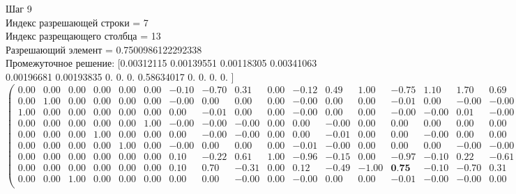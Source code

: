 \documentclass{article}
\begin{document}
\begin{flushleft}
    Шаг 9\\
Индекс разрешающей строки = 7\\
Индекс разрещающего столбца = 13\\
Разрешающий элемент = 0.7500986122292338\\
Промежуточное решение:
 [0.00312115 0.00139551 0.00118305 0.00341063 0.00196681 0.00193835
 0.         0.         0.         0.58634017 0.         0.
 0.         0.        ]
\begin{equation*}
\begin{pmatrix}
 0.00 & 0.00 & 0.00 & 0.00 & 0.00 & 0.00 & -0.10 & -0.70 &  0.31 & 0.00 & -0.12 &  0.49 &  1.00 & -0.75 &  1.10 &  1.70 &  0.69 &  1.00 &  1.12 &  0.51 & 0.00 &  1.75 & -0.12 \\
 0.00 & 1.00 & 0.00 & 0.00 & 0.00 & 0.00 & -0.00 &  0.00 &  0.00 & 0.00 & -0.00 &  0.00 &  0.00 & -0.01 &  0.00 & -0.00 & -0.00 &  0.00 &  0.00 & -0.00 & 0.00 &  0.01 &  0.00 \\
 1.00 & 0.00 & 0.00 & 0.00 & 0.00 & 0.00 &  0.00 & -0.01 &  0.00 & 0.00 & -0.00 &  0.00 &  0.00 & -0.00 & -0.00 &  0.01 & -0.00 &  0.00 &  0.00 & -0.00 & 0.00 &  0.00 &  0.00 \\
 0.00 & 0.00 & 0.00 & 0.00 & 0.00 & 1.00 & -0.00 & -0.00 & -0.00 & 0.00 &  0.00 & -0.00 &  0.00 &  0.00 &  0.00 &  0.00 &  0.00 &  0.00 & -0.00 &  0.00 & 0.00 & -0.00 &  0.00 \\
 0.00 & 0.00 & 0.00 & 1.00 & 0.00 & 0.00 &  0.00 & -0.00 & -0.00 & 0.00 &  0.00 & -0.01 &  0.00 &  0.00 & -0.00 &  0.00 &  0.00 &  0.00 & -0.00 &  0.01 & 0.00 & -0.00 &  0.00 \\
 0.00 & 0.00 & 0.00 & 0.00 & 1.00 & 0.00 & -0.00 &  0.00 &  0.00 & 0.00 & -0.01 & -0.00 &  0.00 &  0.00 &  0.00 & -0.00 & -0.00 &  0.00 &  0.01 &  0.00 & 0.00 & -0.00 &  0.00 \\
 0.00 & 0.00 & 0.00 & 0.00 & 0.00 & 0.00 &  0.10 & -0.22 &  0.61 & 1.00 & -0.96 & -0.15 &  0.00 & -0.97 & -0.10 &  0.22 & -0.61 & -1.00 &  0.96 &  0.15 & 0.00 &  0.97 &  0.59 \\
 0.00 & 0.00 & 0.00 & 0.00 & 0.00 & 0.00 &  0.10 &  0.70 & -0.31 & 0.00 &  0.12 & -0.49 & -1.00 &  \textbf{0.75} & -0.10 & -0.70 &  0.31 &  0.00 & -0.12 &  0.49 & 1.00 & -0.75 &  0.12 \\
 0.00 & 0.00 & 1.00 & 0.00 & 0.00 & 0.00 &  0.00 &  0.00 & -0.00 & 0.00 & -0.00 &  0.00 &  0.00 & -0.01 & -0.00 & -0.00 &  0.00 &  0.00 &  0.00 & -0.00 & 0.00 &  0.01 &  0.00 \\
\end{pmatrix}
\end{equation*}
\end{flushleft}
\end{document}
